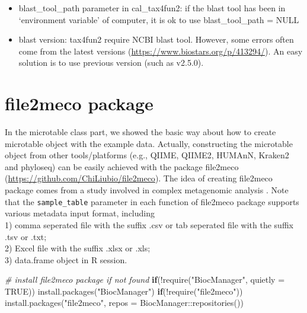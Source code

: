 \documentclass[
]{book}
\newenvironment{Shaded}{\begin{snugshade}}{\end{snugshade}}
\newcommand{\AttributeTok}[1]{\textcolor[rgb]{0.77,0.63,0.00}{#1}}
\newcommand{\CommentTok}[1]{\textcolor[rgb]{0.56,0.35,0.01}{\textit{#1}}}
\newcommand{\ConstantTok}[1]{\textcolor[rgb]{0.00,0.00,0.00}{#1}}
\newcommand{\ControlFlowTok}[1]{\textcolor[rgb]{0.13,0.29,0.53}{\textbf{#1}}}
\newcommand{\FunctionTok}[1]{\textcolor[rgb]{0.00,0.00,0.00}{#1}}
\newcommand{\NormalTok}[1]{#1}
\newcommand{\SpecialCharTok}[1]{\textcolor[rgb]{0.00,0.00,0.00}{#1}}
\newcommand{\StringTok}[1]{\textcolor[rgb]{0.31,0.60,0.02}{#1}}
\providecommand{\tightlist}{%
  \setlength{\itemsep}{0pt}\setlength{\parskip}{0pt}}
\begin{document}
\begin{itemize}
\tightlist
\item
  blast\_tool\_path parameter in cal\_tax4fun2: if the blast tool has been in `environment variable' of computer, it is ok to use blast\_tool\_path = NULL
\item
  blast version: tax4fun2 require NCBI blast tool. However, some errors often come from the latest versions (\url{https://www.biostars.org/p/413294/}). An easy solution is to use previous version (such as v2.5.0).
\end{itemize}

\hypertarget{file2meco-package}{%
\chapter{file2meco package}\label{file2meco-package}}

In the microtable class part, we showed the basic way about how to create microtable object with the example data.
Actually, constructing the microtable object from other tools/platforms (e.g., QIIME, QIIME2, HUMAnN, Kraken2 and phyloseq)
can be easily achieved with the package file2meco (\url{https://github.com/ChiLiubio/file2meco}).
The idea of creating file2meco package comes from a study involved in complex metagenomic analysis \citep{Liu_Microbial_2022}.
Note that the \texttt{sample\_table} parameter in each function of file2meco package supports various metadata input format, including\\
1) comma seperated file with the suffix .csv or tab seperated file with the suffix .tsv or .txt;\\
2) Excel file with the suffix .xlsx or .xls;\\
3) data.frame object in R session.

\begin{Shaded}
\begin{Highlighting}[]
\CommentTok{\# install file2meco package if not found}
\ControlFlowTok{if}\NormalTok{(}\SpecialCharTok{!}\FunctionTok{require}\NormalTok{(}\StringTok{"BiocManager"}\NormalTok{, }\AttributeTok{quietly =} \ConstantTok{TRUE}\NormalTok{)) }\FunctionTok{install.packages}\NormalTok{(}\StringTok{"BiocManager"}\NormalTok{)}
\ControlFlowTok{if}\NormalTok{(}\SpecialCharTok{!}\FunctionTok{require}\NormalTok{(}\StringTok{"file2meco"}\NormalTok{)) }\FunctionTok{install.packages}\NormalTok{(}\StringTok{"file2meco"}\NormalTok{, }\AttributeTok{repos =}\NormalTok{ BiocManager}\SpecialCharTok{::}\FunctionTok{repositories}\NormalTok{())}
\end{Highlighting}
\end{Shaded}
\end{document}
